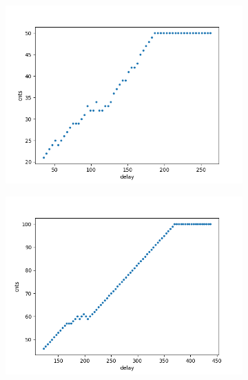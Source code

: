         \begin{figure}[h!]
            \begin{subfigure}{.5\textwidth}
            \centering
            \includegraphics[width=.98\linewidth]{figures/charaterization/efficiency_5pixels.png}
            \caption{}
            \label{fig:}
            \end{subfigure}
            \begin{subfigure}{.5\textwidth}
            \centering
            \includegraphics[width=.98\linewidth]{figures/charaterization/efficiency_10pixels.png}
            \caption{}
            \label{fig:}
            \end{subfigure}
        \end{figure}
        
